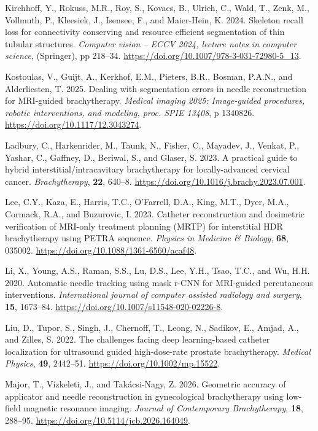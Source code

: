 \documentclass[
  11pt,
]{article}
\newlength{\cslhangindent}
\newenvironment{CSLReferences}[2] %
 {\begin{list}{}{%
  \setlength{\itemindent}{0pt}
  \setlength{\leftmargin}{0pt}
  \setlength{\parsep}{0pt}
  \ifodd #1
   \setlength{\leftmargin}{\cslhangindent}
   \setlength{\itemindent}{-1\cslhangindent}
  \fi
  \setlength{\itemsep}{#2\baselineskip}}}
 {\end{list}}
\begin{document}
\begin{CSLReferences}{1}{1}
Kirchhoff, Y., Rokuss, M.R., Roy, S., Kovacs, B., Ulrich, C., Wald, T.,
Zenk, M., Vollmuth, P., Kleesiek, J., Isensee, F., and Maier-Hein, K.
2024. Skeleton recall loss for connectivity conserving and resource
efficient segmentation of thin tubular structures. \emph{Computer vision
-- ECCV 2024, lecture notes in computer science}, (Springer), pp
218--34. \url{https://doi.org/10.1007/978-3-031-72980-5_13}.

Kostoulas, V., Guijt, A., Kerkhof, E.M., Pieters, B.R., Bosman, P.A.N.,
and Alderliesten, T. 2025. Dealing with segmentation errors in needle
reconstruction for {MRI}-guided brachytherapy. \emph{Medical imaging
2025: Image-guided procedures, robotic interventions, and modeling,
proc. SPIE 13408}, p 1340826. \url{https://doi.org/10.1117/12.3043274}.

Ladbury, C., Harkenrider, M., Taunk, N., Fisher, C., Mayadev, J.,
Venkat, P., Yashar, C., Gaffney, D., Beriwal, S., and Glaser, S. 2023. A
practical guide to hybrid interstitial/intracavitary brachytherapy for
locally-advanced cervical cancer. \emph{Brachytherapy}, \textbf{22},
640--8. \url{https://doi.org/10.1016/j.brachy.2023.07.001}.

Lee, C.Y., Kaza, E., Harris, T.C., O'Farrell, D.A., King, M.T., Dyer,
M.A., Cormack, R.A., and Buzurovic, I. 2023. Catheter reconstruction and
dosimetric verification of {MRI}-only treatment planning ({MRTP}) for
interstitial {HDR} brachytherapy using {PETRA} sequence. \emph{Physics
in Medicine \& Biology}, \textbf{68}, 035002.
\url{https://doi.org/10.1088/1361-6560/acaf48}.

Li, X., Young, A.S., Raman, S.S., Lu, D.S., Lee, Y.H., Tsao, T.C., and
Wu, H.H. 2020. Automatic needle tracking using mask r-CNN for MRI-guided
percutaneous interventions. \emph{International journal of computer
assisted radiology and surgery}, \textbf{15}, 1673--84.
\url{https://doi.org/10.1007/s11548-020-02226-8}.

Liu, D., Tupor, S., Singh, J., Chernoff, T., Leong, N., Sadikov, E.,
Amjad, A., and Zilles, S. 2022. The challenges facing deep
learning-based catheter localization for ultrasound guided
high-dose-rate prostate brachytherapy. \emph{Medical Physics},
\textbf{49}, 2442--51. \url{https://doi.org/10.1002/mp.15522}.

Major, T., Vízkeleti, J., and Takácsi-Nagy, Z. 2026. Geometric accuracy
of applicator and needle reconstruction in gynecological brachytherapy
using low-field magnetic resonance imaging. \emph{Journal of
Contemporary Brachytherapy}, \textbf{18}, 288--95.
\url{https://doi.org/10.5114/jcb.2026.164049}.


\end{CSLReferences}
\end{document}

